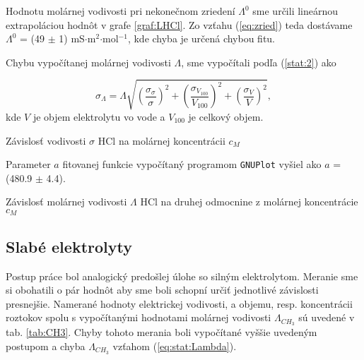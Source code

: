 \documentclass{article}
\begin{document}
Hodnotu molárnej vodivosti pri nekonečnom zriedení $\Lambda^0$ sme určili lineárnou extrapoláciou hodnôt v grafe \ref{graf:LHCl}. Zo vzťahu (\ref{eq:zried}) teda dostávame $\Lambda^0$ = (49 $\pm$ 1) mS${\cdot}$m$^2$${\cdot}$mol$^{-1}$, kde chyba je určená chybou fitu.

\newpage
Chybu vypočítanej molárnej vodivosti $\Lambda$, sme vypočítali podľa (\ref{stat:2}) ako 

\begin{equation} \label{eq:stat:Lambda}
    \sigma_{\Lambda} = {\Lambda}\sqrt{\left(\frac{{\sigma}_{\sigma}}{\sigma}\right)^2 + \left(\frac{{\sigma}_{V_{100}}}{V_{100}}\right)^2 + \left(\frac{{\sigma}_{V}}{V}\right)^2}, 
\end{equation}
kde $V$ je objem elektrolytu vo vode a $V_{100}$ je celkový objem.
 
\begin{graph}[H]
		\centering
		
		\caption{Závislosť vodivosti $\sigma$ HCl na molárnej koncentrácii $c_M$}
		\label{graf:HCl}
\end{graph}

Parameter $a$ fitovanej funkcie vypočítaný programom \texttt{GNUPlot} vyšiel ako $a$ = (480.9 $\pm$ 4.4).

\begin{graph}[H]
		\centering
		
		\caption{Závislosť molárnej vodivosti $\Lambda$ HCl na druhej odmocnine z molárnej koncentrácie $c_M$}
		\label{graf:LHCl}
\end{graph}


\subsection{Slabé elektrolyty}
Postup práce bol analogický predošlej úlohe so silným elektrolytom. Meranie sme si obohatili o pár hodnôt aby sme boli schopní určiť jednotlivé závislosti presnejšie. Namerané hodnoty elektrickej vodivosti, a objemu, resp. koncentrácii roztokov spolu s vypočítanými hodnotami molárnej vodivosti $\Lambda_{CH_3}$ sú uvedené v tab. \ref{tab:CH3}. Chyby tohoto merania boli vypočítané vyššie uvedeným postupom a chyba $\Lambda_{CH_3}$ vzťahom (\ref{eq:stat:Lambda}). 
\end{document}
